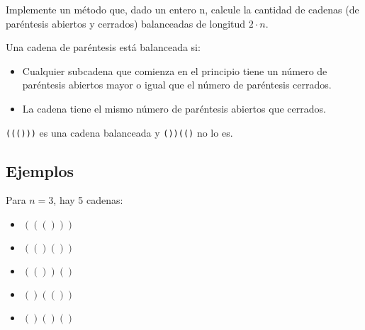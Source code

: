 Implemente un método que, dado un entero n, calcule la cantidad de cadenas (de paréntesis abiertos y cerrados) balanceadas de longitud $2 \cdot n$.

Una cadena de paréntesis está balanceada si:
\begin{itemize}
    \item Cualquier subcadena que comienza en el principio tiene un número de paréntesis abiertos mayor o igual que el número de paréntesis cerrados.
    \item La cadena tiene el mismo número de paréntesis abiertos que cerrados.
\end{itemize}

\texttt{((()))} es una cadena balanceada y \texttt{())(()} no lo es.

\subsection*{Ejemplos}

Para \( n = 3 \), hay 5 cadenas:
\begin{itemize}
    \item \( ((())) \)
    \item \( (()()) \)
    \item \( (())() \)
    \item \( ()(()) \)
    \item \( ()()() \)
\end{itemize}